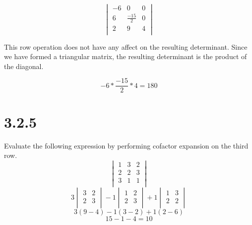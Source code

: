 \documentclass[journal]{IEEEtran}
\begin{document}
{			\[
				\begin{vmatrix}
					-6&	0&	0 \\
					6&	\frac{-15}{2}&	0 \\
					2&	9&	4 \\
				\end{vmatrix}
			\]

			This row operation does not have any affect on the resulting determinant. Since we have formed a triangular matrix, the resulting determinant is the product of the diagonal.

			\[
				-6*\frac{-15}{2}*4=180
			\]
		\section*{\Large{\textbf{3.2.5}}}
			Evaluate the following expression by performing cofactor expansion on the third row.
			\[
				\begin{vmatrix}
					1&	3&	2 \\
					2&	2&	3 \\
					3&	1&	1 \\
				\end{vmatrix}
			\]
			\[
				3\begin{vmatrix}
					3&	2 \\
					2&	3 \\
				\end{vmatrix}
				-1\begin{vmatrix}
					1&	2\\
					2&	3\\
				\end{vmatrix}
				+1\begin{vmatrix}
					1&	3\\
					2&	2\\
				\end{vmatrix}
			\]
			\[
				3(9-4)-1(3-2)+1(2-6)
			\]
			\[
				15-1-4=10
			\]
		\newpage
}
\end{document}

